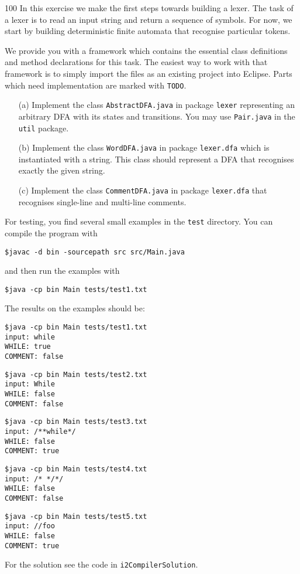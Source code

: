 \documentclass[a4paper]{article}
\begin{document}
\begin{exercise}{100}
   In this exercise we make the first steps towards building a lexer. The task of a lexer is to read an input string and return a sequence of symbols. For now, we start by building deterministic finite automata that recognise particular tokens.

   We provide you with a framework which contains the essential class definitions and method declarations for this task. The easiest way to work with that framework is to simply import the files as an existing project into Eclipse. Parts which need implementation are marked with \texttt{TODO}.
   \begin{enumerate}
    \item[(a)] Implement the class \texttt{AbstractDFA.java} in package \texttt{lexer} representing an arbitrary DFA with its states and transitions. You may use \texttt{Pair.java} in the \texttt{util} package.
    \item[(b)] Implement the class \texttt{WordDFA.java} in package \texttt{lexer.dfa} which is instantiated with a string. This class should represent a DFA that recognises exactly the given string.
    \item[(c)] Implement the class \texttt{CommentDFA.java} in package \texttt{lexer.dfa} that recognises single-line and multi-line comments.
   \end{enumerate}
   For testing, you find several small examples in the \texttt{test} directory. You can compile the program with
   \begin{lstlisting}[numbers=none,basicstyle=\ttfamily]
      $javac -d bin -sourcepath src src/Main.java
   \end{lstlisting}
   and then run the examples with
   \begin{lstlisting}[numbers=none,basicstyle=\ttfamily]
      $java -cp bin Main tests/test1.txt
   \end{lstlisting}

   The results on the examples should be:

   \begin{lstlisting}[basicstyle=\ttfamily,numbers=none]
$java -cp bin Main tests/test1.txt
input: while
WHILE: true
COMMENT: false
   \end{lstlisting}
   \begin{lstlisting}[basicstyle=\ttfamily,numbers=none]
$java -cp bin Main tests/test2.txt
input: While
WHILE: false
COMMENT: false
   \end{lstlisting}
   \begin{lstlisting}[basicstyle=\ttfamily,numbers=none]
$java -cp bin Main tests/test3.txt
input: /**while*/
WHILE: false
COMMENT: true
   \end{lstlisting}
   \begin{lstlisting}[basicstyle=\ttfamily,numbers=none]
$java -cp bin Main tests/test4.txt
input: /* */*/
WHILE: false
COMMENT: false
   \end{lstlisting}
   \begin{lstlisting}[basicstyle=\ttfamily,numbers=none]
$java -cp bin Main tests/test5.txt
input: //foo
WHILE: false
COMMENT: true
   \end{lstlisting}
\end{exercise}

\begin{solution}
For the solution see the code in \texttt{i2CompilerSolution}.
\end{solution}
\end{document}
